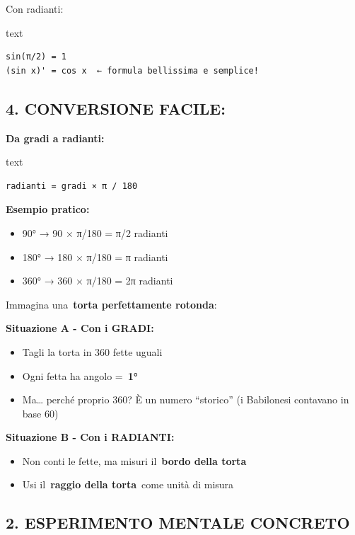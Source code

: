 \documentclass[
]{article}
\providecommand{\tightlist}{%
  \setlength{\itemsep}{0pt}\setlength{\parskip}{0pt}}
\begin{document}
Con radianti:

text

\begin{verbatim}
sin(π/2) = 1
(sin x)' = cos x  ← formula bellissima e semplice!
\end{verbatim}

\hypertarget{conversione-facile}{%
\subsection{\texorpdfstring{\textbf{4. CONVERSIONE FACILE:}}{4. CONVERSIONE FACILE:}}\label{conversione-facile}}

\textbf{Da gradi a radianti:}

text

\begin{verbatim}
radianti = gradi × π / 180
\end{verbatim}

\textbf{Esempio pratico:}

\begin{itemize}
\tightlist
\item
  90° → 90 × π/180 = π/2 radianti
\item
  180° → 180 × π/180 = π radianti
\item
  360° → 360 × π/180 = 2π radianti
\end{itemize}

Immagina una~\textbf{torta perfettamente rotonda}:

\textbf{Situazione A - Con i GRADI:}

\begin{itemize}
\tightlist
\item
  Tagli la torta in 360 fette uguali
\item
  Ogni fetta ha angolo =~\textbf{1°}
\item
  Ma\ldots{} perché proprio 360? È un numero ``storico'' (i Babilonesi contavano in base 60)
\end{itemize}

\textbf{Situazione B - Con i RADIANTI:}

\begin{itemize}
\tightlist
\item
  Non conti le fette, ma misuri il~\textbf{bordo della torta}
\item
  Usi il~\textbf{raggio della torta}~come unità di misura
\end{itemize}

\hypertarget{esperimento-mentale-concreto}{%
\subsection{\texorpdfstring{\textbf{2. ESPERIMENTO MENTALE CONCRETO}}{2. ESPERIMENTO MENTALE CONCRETO}}\label{esperimento-mentale-concreto}}
\end{document}
